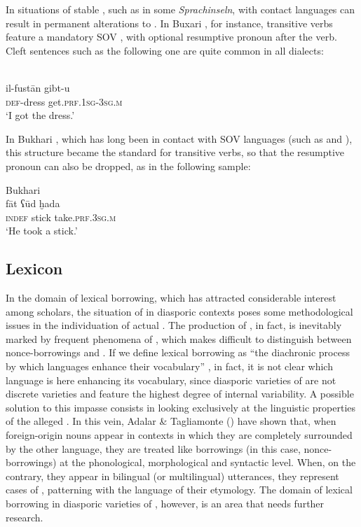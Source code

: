 \documentclass[output=paper]{langsci/langscibook}
\begin{document}
In situations of stable , such as in some  \textit{Sprachinseln},  with contact languages can result in permanent alterations to . In Buxari , for instance, transitive verbs feature a mandatory SOV , with optional resumptive pronoun after the verb. Cleft sentences such as the following one are quite common in all  dialects:

\ea\label{ex:key:}
{  \citep[145]{Ratcliffe2005}}\\
\gll il-fustān  gibt-u\\
     \textsc{def-}dress  get.\textsc{prf.1sg-3sg.m}\\
\glt ‘I got the dress.’
\z

In Bukhari , which has long been in contact with SOV languages (such as  and ), this structure became the standard for transitive verbs, so that the resumptive pronoun can also be dropped, as in the following sample:

\ea\label{ex:key:}
{Bukhari   \citep[144]{Ratcliffe2005}}\\
\gll   fāt ʕūd ḫada\\
       \textsc{indef} stick take\textsc{.prf.3sg.m}\\
\glt ‘He took a stick.’
\z


 
 \subsection{Lexicon}


In the domain of lexical borrowing, which has attracted considerable interest among scholars, the situation of  in diasporic contexts poses some methodological issues in the individuation of actual . The production of , in fact, is inevitably marked by frequent phenomena of , which makes difficult to distinguish between nonce-borrowings \citep{Poplack1980} and . If we define lexical borrowing as “the diachronic process by which languages enhance their vocabulary” \citep[106]{Matras2009}, in fact, it is not clear which language is here enhancing its vocabulary, since diasporic varieties of  are not discrete varieties and feature the highest degree of internal variability. A possible solution to this impasse consists in looking exclusively at the linguistic properties of the alleged . In this vein, Adalar \& Tagliamonte (\citeyear[156]{AdalarTagliamonte1998}) have shown that, when foreign-origin nouns appear in contexts in which they are completely surrounded by the other language, they are treated like borrowings (in this case, nonce-borrowings) at the phonological, morphological and syntactic level. When, on the contrary, they appear in bilingual (or multilingual) utterances, they represent cases of , patterning with the language of their etymology. The domain of lexical borrowing in diasporic varieties of , however, is an area that needs further research.
\end{document}
